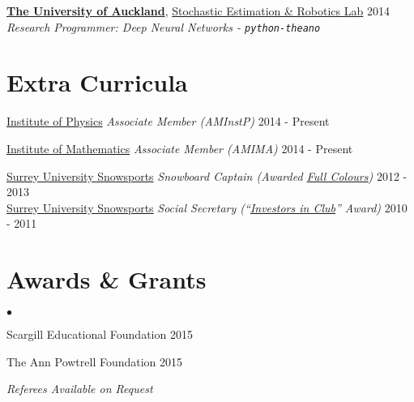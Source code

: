 \documentclass[margin, line]{res}
\newcommand{\IOP}{http://www.iop.org}
\newcommand{\IOM}{http://www.ima.org.uk}
\newcommand{\AucklandUni}{https://www.cs.auckland.ac.nz/en.html}
\newcommand{\AucklandResearch}{http://homepages.engineering.auckland.ac.nz/~smohan/Research.html}
\newcommand{\susnow}{}%
\newcommand{\eussc}{}%
\newcommand{\Colours}{http://www.ussu.co.uk/ClubsSocieties/Sport/Colours\%20Documents/Colours\%20-\%20Individual\%20Club\%20Exceptions\%20to\%20Colours\%20Criteria\%202014\%20(FINAL).pdf}
\newcommand{\Investors}{http://www.ussu.co.uk/_layouts/15/listform.aspx?PageType=4&ListId=\%7BA7F9F9F7\%2D400C\%2D4935\%2DA942\%2D261CD2EB0385\%7D&ID=9&ContentTypeID=0x01002CF74A4DAE39480396EEA7A4BA2BE5FB007726A7C1BCA6FD4195927B28465DCEE5}
\newenvironment{list2}{
	\begin{list}{$\bullet$}{%
		\setlength{\itemsep}{0in}
		\setlength{\parsep}{0in} \setlength{\parskip}{0in}
		\setlength{\topsep}{0in} \setlength{\partopsep}{0in}
		\setlength{\leftmargin}{0.2in}}}{\end{list}}
\begin{document}
\begin{resume}
{\bf \href{\AucklandUni}{The University of Auckland}}, \href{\AucklandResearch}{Stochastic Estimation \& Robotics Lab} \hfill {2014}
\\
\vspace{-.3cm}
{\em Research Programmer: Deep Neural Networks - \verb|python-theano|}\\


\vspace{0.15in}
\section{\sc Extra Curricula}
{\href{\IOP}{Institute of Physics}}
\vspace*{-.0in}
{\em Associate Member (AMInstP)} \hfill { 2014 - Present} \\
\vspace*{-0.3in}

{\href{\IOM}{Institute of Mathematics}}
{\em Associate Member (AMIMA)} \hfill { 2014 - Present} \\
\vspace*{-0.3in}

{\href{\susnow}{Surrey University Snowsports}}
	{\em Snowboard Captain (Awarded \href{\Colours}{Full Colours})} \hfill {2012 - 2013}
\\
{\href{\susnow}{Surrey University Snowsports}}
	{\em Social Secretary (``\href{\Investors}{Investors in Club}'' Award)} \hfill {2010 - 2011} 


\vspace{0.15in}
\section{\sc Awards \& Grants}
\begin{list2}
	\item Scargill Educational Foundation \hfill {2015}
	\item The Ann Powtrell Foundation \hfill {2015}
\end{list2}
\vspace{0.2in}
\centerline{\emph{Referees Available on Request}}

\end{resume}
\end{document}
